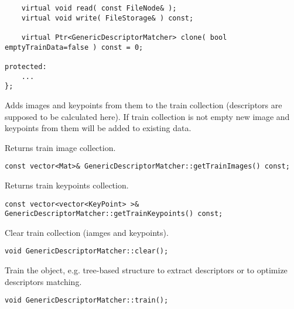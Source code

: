 \begin{lstlisting}
    virtual void read( const FileNode& );
    virtual void write( FileStorage& ) const;
    
    virtual Ptr<GenericDescriptorMatcher> clone( bool emptyTrainData=false ) const = 0;

protected:
    ...
};
\end{lstlisting}

Adds images and keypoints from them to the train collection (descriptors are supposed to be calculated here).
If train collection is not empty new image and keypoints from them will be added to 
existing data.


\begin{description}
\end{description}

Returns train image collection.

\begin{lstlisting}
const vector<Mat>& GenericDescriptorMatcher::getTrainImages() const;
\end{lstlisting}

Returns train keypoints collection.

\begin{lstlisting}
const vector<vector<KeyPoint> >& 
GenericDescriptorMatcher::getTrainKeypoints() const;
\end{lstlisting}

Clear train collection (iamges and keypoints).

\begin{lstlisting}
void GenericDescriptorMatcher::clear();
\end{lstlisting}

Train the object, e.g. tree-based structure to extract descriptors or 
to optimize descriptors matching.

\begin{lstlisting}
void GenericDescriptorMatcher::train();
\end{lstlisting}

